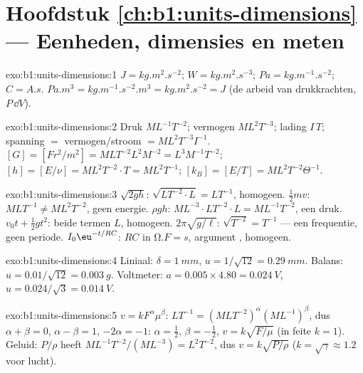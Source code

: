 \section*{Hoofdstuk \ref{ch:b1:units-dimensions} --- Eenheden, dimensies en meten}

\begin{solution}{exo:b1:units-dimensions:1}
$\unit{J} = \unit{kg.m^2.s^{-2}}$; $\unit{W} = \unit{kg.m^2.s^{-3}}$;
$\unit{Pa} = \unit{kg.m^{-1}.s^{-2}}$; $\unit{C} = \unit{A.s}$.
$\unit{Pa.m^3} = \unit{kg.m^{-1}.s^{-2}.m^3} = \unit{kg.m^2.s^{-2}} = \unit{J}$
(de arbeid van drukkrachten, $P\,\dd V$).
\end{solution}

\begin{solution}{exo:b1:units-dimensions:2}
Druk $M L^{-1} T^{-2}$; vermogen $M L^2 T^{-3}$; lading $I\,T$;
spanning $= $ vermogen/stroom $= M L^2 T^{-3} I^{-1}$.
$[G] = [F r^2/m^2] = M L T^{-2} L^2 M^{-2} = L^3 M^{-1} T^{-2}$;
$[h] = [E/\nu] = M L^2 T^{-2} \cdot T = M L^2 T^{-1}$;
$[k_B] = [E/T] = M L^2 T^{-2} \Theta^{-1}$.
\end{solution}

\begin{solution}{exo:b1:units-dimensions:3}
$\sqrt{2gh}$: $\sqrt{L T^{-2} \cdot L} = L T^{-1}$, homogeen.
$\tfrac12 mv$: $M L T^{-1} \neq M L^2 T^{-2}$, geen energie.
$\rho g h$: $M L^{-3} \cdot L T^{-2} \cdot L = M L^{-1} T^{-2}$, een druk.
$v_0 t + \tfrac12 g t^2$: beide termen $L$, homogeen.
$2\pi\sqrt{g/\ell}$: $\sqrt{T^{-2}} = T^{-1}$ --- een frequentie, geen periode.
$I_0\eu^{-t/RC}$: $RC$ in $\unit{\ohm.F} = \unit{s}$, argument , homogeen.
\end{solution}

\begin{solution}{exo:b1:units-dimensions:4}
Liniaal: $\delta = \qty{1}{mm}$, $u = 1/\sqrt{12} = \qty{0.29}{mm}$.
Balans: $u = 0.01/\sqrt{12} = \qty{0.003}{g}$.
Voltmeter: $a = 0.005 \times 4.80 = \qty{0.024}{V}$,
$u = 0.024/\sqrt3 = \qty{0.014}{V}$.
\end{solution}

\begin{solution}{exo:b1:units-dimensions:5}
$v = k F^\alpha \mu^\beta$: $L T^{-1} = (M L T^{-2})^\alpha (M L^{-1})^\beta$,
dus $\alpha + \beta = 0$, $\alpha - \beta = 1$, $-2\alpha = -1$:
$\alpha = \tfrac12$, $\beta = -\tfrac12$, $v = k\sqrt{F/\mu}$ (in feite $k = 1$).
Geluid: $P/\rho$ heeft  $M L^{-1} T^{-2} / (M L^{-3}) = L^2 T^{-2}$,
dus $v = k\sqrt{P/\rho}$ ($k = \sqrt\gamma \approx 1.2$ voor lucht).
\end{solution}

